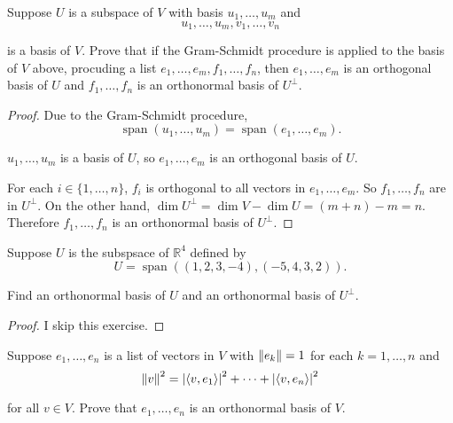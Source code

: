 \begin{exercise}
    Suppose $U$ is a subspace of $V$ with basis $u_{1}, \ldots, u_{m}$ and
    \[
        u_{1}, \ldots, u_{m}, v_{1}, \ldots, v_{n}
    \]

    is a basis of $V$. Prove that if the Gram-Schmidt procedure is applied to the basis of $V$ above, procuding a list $e_{1}, \ldots, e_{m}, f_{1}, \ldots, f_{n}$, then $e_{1}, \ldots, e_{m}$ is an orthogonal basis of $U$ and $f_{1}, \ldots, f_{n}$ is an orthonormal basis of $U^{\bot}$.
\end{exercise}

\begin{proof}
    Due to the Gram-Schmidt procedure,
    \[
        \operatorname{span}(u_{1}, \ldots, u_{m}) = \operatorname{span}(e_{1}, \ldots, e_{m}).
    \]

    $u_{1}, \ldots, u_{m}$ is a basis of $U$, so $e_{1}, \ldots, e_{m}$ is an orthogonal basis of $U$.

    For each $i\in\{ 1,\ldots, n \}$, $f_{i}$ is orthogonal to all vectors in $e_{1}, \ldots, e_{m}$. So $f_{1}, \ldots, f_{n}$ are in $U^{\bot}$. On the other hand, $\dim U^{\bot} = \dim V - \dim U = (m + n) - m = n$. Therefore $f_{1}, \ldots, f_{n}$ is an orthonormal basis of $U^{\bot}$.
\end{proof}
\newpage

\begin{exercise}
    Suppose $U$ is the subspsace of $\mathbb{R}^{4}$ defined by
    \[
        U = \operatorname{span}((1, 2, 3, -4), (-5, 4, 3, 2)).
    \]

    Find an orthonormal basis of $U$ and an orthonormal basis of $U^{\bot}$.
\end{exercise}

\begin{proof}
    I skip this exercise.
\end{proof}
\newpage

\begin{exercise}
    Suppose $e_{1}, \ldots, e_{n}$ is a list of vectors in $V$ with $\left\Vert{e_{k}}\right\Vert = 1$ for each $k = 1, \ldots, n$ and
    \[
        \left\Vert{v}\right\Vert^{2} = \left\vert{\left\langle{v, e_{1}}\right\rangle}\right\vert^{2} + \cdots + \left\vert{\left\langle{v, e_{n}}\right\rangle}\right\vert^{2}
    \]

    for all $v\in V$. Prove that $e_{1}, \ldots, e_{n}$ is an orthonormal basis of $V$.
\end{exercise}

